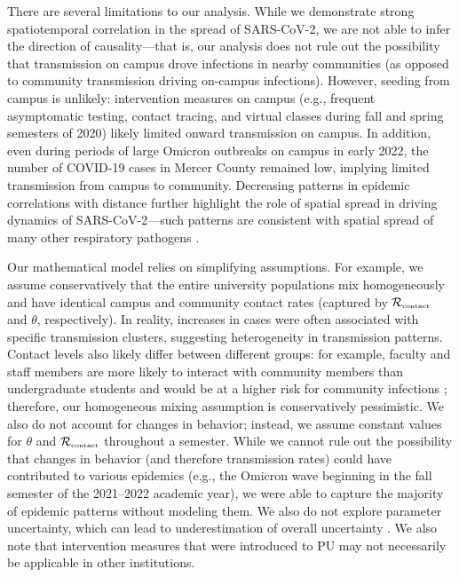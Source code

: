 \documentclass[12pt]{article}
\newcommand{\Rx}[1]{\ensuremath{{\mathcal R}_{#1}}}
\newcommand{\Rc}{\Rx{\textrm{\tiny{contact}}}}
\begin{document}
There are several limitations to our analysis.
While we demonstrate strong spatiotemporal correlation in the spread of SARS-CoV-2, we are not able to infer the direction of causality---that is, our analysis does not rule out the possibility that transmission on campus drove infections in nearby communities (as opposed to community transmission driving on-campus infections).
However, seeding from campus is unlikely: 
intervention measures on campus (e.g., frequent asymptomatic testing, contact tracing, and virtual classes during fall and spring semesters of 2020) likely limited onward transmission on campus.
In addition, even during periods of large Omicron outbreaks on campus in early 2022, the number of COVID-19 cases in Mercer County remained low, implying limited transmission from campus to community.
Decreasing patterns in epidemic correlations with distance further highlight the role of spatial spread in driving dynamics of SARS-CoV-2---such patterns are consistent with spatial spread of many other respiratory pathogens \citep{grenfell2001travelling, viboud2006synchrony, baker2019epidemic}.

Our mathematical model relies on simplifying assumptions.
For example, we assume conservatively that the entire university populations mix homogeneously and have identical campus and community contact rates (captured by $\Rc$ and $\theta$, respectively).
In reality, increases in cases were often associated with specific transmission clusters, suggesting heterogeneity in transmission patterns.
Contact levels also likely differ between different groups:
for example, faculty and staff members are more likely to interact with community members than undergraduate students and would be at a higher risk for community infections \citep{frazier2022modeling};
therefore, our homogeneous mixing assumption is conservatively pessimistic.
We also do not account for changes in behavior; 
instead, we assume constant values for $\theta$ and $\Rc$ throughout a semester.
While we cannot rule out the possibility that changes in behavior (and therefore transmission rates) could have contributed to various epidemics (e.g., the Omicron wave beginning in the fall semester of the 2021--2022 academic year), we were able to capture the majority of epidemic patterns without modeling them. 
We also do not explore parameter uncertainty, which can lead to underestimation of overall uncertainty \citep{elderd2006uncertainty}. 
We also note that intervention measures that were introduced to PU may not necessarily be applicable in other institutions.
\end{document}
